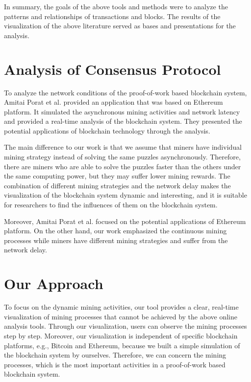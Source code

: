 In summary, the goals of the above tools and methods were to analyze the patterns and relationships of transactions and blocks. The results of the visualization of the above literature served as bases and presentations for the analysis. 

\section{Analysis of Consensus Protocol}

To analyze the network conditions of the proof-of-work based blockchain system, Amitai Porat et al. \cite{Porat} provided an application that was based on Ethereum platform. It simulated the asynchronous mining activities and network latency and provided a real-time analysis of the blockchain system. They presented the potential applications of blockchain technology through the analysis.

The main difference to our work is that we assume that miners have individual mining strategy instead of solving the same puzzles asynchronously. Therefore, there are miners who are able to solve the puzzles faster than the others under the same computing power, but they may suffer lower mining rewards. The combination of different mining strategies and the network delay makes the visualization of the blockchain system dynamic and interesting, and it is suitable for researchers to find the influences of them on the blockchain system. 

Moreover, Amitai Porat et al. focused on the potential applications of Ethereum platform. On the other hand, our work emphasized the continuous mining processes while miners have different mining strategies and suffer from the network delay. 

\section{Our Approach}

To focus on the dynamic mining activities, our tool provides a clear, real-time visualization of mining processes that cannot be achieved by the above online analysis tools. Through our visualization, users can observe the mining processes step by step. Moreover, our visualization is independent of specific blockchain platforms, e.g., Bitcoin and Ethereum, because we built a simple simulation of the blockchain system by ourselves. Therefore, we can concern the mining processes, which is the most important activities in a proof-of-work based blockchain system.

